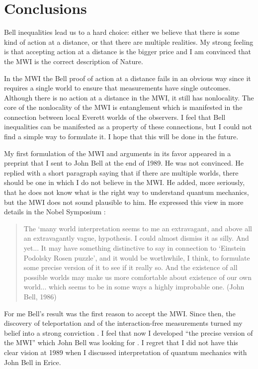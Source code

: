 \documentclass[12pt]{article}
\begin{document}
\section{Conclusions}

Bell inequalities lead us to a hard choice: either we believe that there is some kind of action at a distance, or that there are multiple realities. My strong feeling is that accepting action at a distance is the bigger price and I am convinced that the MWI is the correct description of Nature.

In the MWI  the Bell proof of action at a distance fails in an obvious way since it requires a single world to ensure that measurements have single outcomes. Although there is no action at a distance in the MWI, it still has nonlocality.
The core of the nonlocality of the MWI is entanglement which is manifested in the connection between local Everett worlds of the observers. I feel that Bell inequalities can be manifested as a property of these connections, but I could not find a simple way to formulate it. I hope that this will be done in the future.

My first formulation of the MWI and arguments in its favor appeared in a preprint \cite{schizo} that I sent to John Bell at the end of 1989. He was not convinced. He replied with a short paragraph saying that if there are multiple worlds, there should be one in which I do not believe in the MWI. He added, more seriously, that he does not know what is the right way to understand quantum mechanics, but the MWI does not sound plausible to him. He expressed this view  in more details in the Nobel Symposium  \cite{Bell86}:
  \begin{quote}
 The `many world interpretation seems to me an extravagant, and above all an extravagantly vague, hypothesis. I could almost dismiss it as silly. And yet... It may have something distinctive to say in connection to `Einstein Podolsky Rosen puzzle', and it would be worthwhile, I think, to formulate some precise version of it to see if it really so. And the existence of all possible worlds may make us more comfortable about existence of our own world... which seems to be in some ways a highly improbable one.\flushright
(John Bell, 1986)
\end{quote}

For me Bell's result  was the first   reason to accept the MWI. Since then, the discovery of  teleportation and of the interaction-free measurements turned my belief into a strong conviction \cite{PSA}. I feel that now I developed ``the precise version of the MWI'' which John Bell was looking for \cite{qmdet}. I regret that I did not have this clear vision at 1989 when I discussed interpretation of quantum mechanics with John Bell in Erice.
\end{document}
